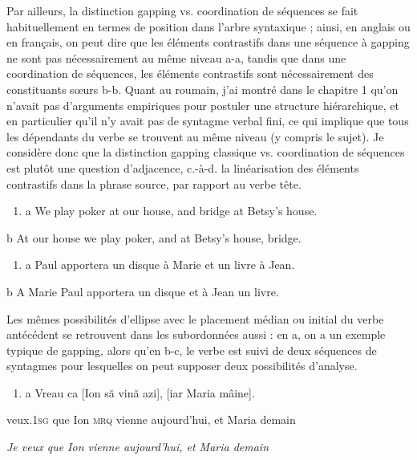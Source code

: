 Par ailleurs, la distinction gapping vs. coordination de séquences se fait habituellement en termes de position dans l'arbre syntaxique ; ainsi, en anglais ou en français, on peut dire que les éléments contrastifs dans une séquence à gapping ne sont pas nécessairement au même niveau a-a, tandis que dans une coordination de séquences, les éléments contrastifs sont nécessairement des constituants s{\oe}urs b-b. Quant au roumain, j'ai montré dans le chapitre 1 qu'on n'avait pas d'arguments empiriques pour postuler une structure hiérarchique, et en particulier qu'il n'y avait pas de syntagme verbal fini, ce qui implique que tous les dépendants du verbe se trouvent au même niveau (y compris le sujet). Je considère donc que la distinction gapping classique vs. coordination de séquences est plutôt une question d'adjacence, c.-à-d. la linéarisation des éléments contrastifs dans la phrase source, par rapport au verbe tête.


\begin{enumerate}
\item \label{bkm:Ref290053881}a   We play poker at our house, and bridge at Betsy's house. 


\end{enumerate}
  b  At our house we play poker, and at Betsy's house, bridge. 


\begin{enumerate}
\item \label{bkm:Ref290053883}a   Paul apportera un disque à Marie et un livre à Jean. 


\end{enumerate}
  b  A Marie Paul apportera un disque et à Jean un livre. 

Les mêmes possibilités d'ellipse avec le placement médian ou initial du verbe antécédent se retrouvent dans les subordonnées aussi : en a, on a un exemple typique de gapping, alors qu'en b-c, le verbe est suivi de deux séquences de syntagmes pour lesquelles on peut supposer deux possibilités d'analyse.


\begin{enumerate}
\item \label{bkm:Ref289967144}a  Vreau ca [Ion să vină azi], [iar Maria mâine].


\end{enumerate}
veux.\textsc{1sg} que Ion \textsc{mrq} vienne aujourd'hui, et Maria demain

{\itshape
Je veux que Ion vienne aujourd'hui, et Maria demain}

